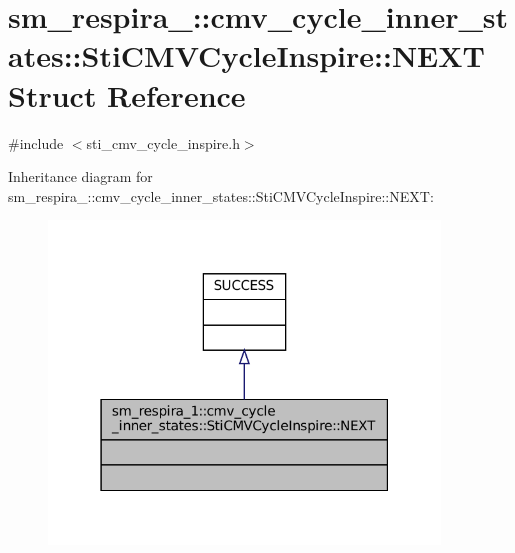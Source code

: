 \hypertarget{structsm__respira__1_1_1cmv__cycle__inner__states_1_1StiCMVCycleInspire_1_1NEXT}{}\section{sm\+\_\+respira\+\_\+:\+:cmv\+\_\+cycle\+\_\+inner\+\_\+states\+:\+:Sti\+C\+M\+V\+Cycle\+Inspire\+:\+:N\+E\+XT Struct Reference}
\label{structsm__respira__1_1_1cmv__cycle__inner__states_1_1StiCMVCycleInspire_1_1NEXT}


{\ttfamily \#include $<$sti\+\_\+cmv\+\_\+cycle\+\_\+inspire.\+h$>$}



Inheritance diagram for sm\+\_\+respira\+\_\+:\+:cmv\+\_\+cycle\+\_\+inner\+\_\+states\+:\+:Sti\+C\+M\+V\+Cycle\+Inspire\+:\+:N\+E\+XT\+:
\nopagebreak
\begin{figure}[H]
\begin{center}
\leavevmode
\includegraphics[width=295pt]{structsm__respira__1_1_1cmv__cycle__inner__states_1_1StiCMVCycleInspire_1_1NEXT__inherit__graph}
\end{center}
\end{figure}


